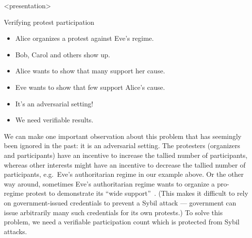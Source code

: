 \begin{frame}<presentation>
  \begin{block}{Verifying protest participation}
    \begin{itemize}
      \item Alice organizes a protest against Eve's regime.
      \item Bob, Carol and others show up.

        \pause

      \item {\color{green} Alice wants to show that many support her cause.}

        \pause

      \item {\color{red} Eve wants to show that few support Alice's cause.}

        \pause

      \item It's an adversarial setting!
      \item We need verifiable results.
    \end{itemize}
  \end{block}
\end{frame}

We can make one important observation about this problem that has seemingly 
been ignored in the past: it is an adversarial setting.
The protesters (organizers and participants) have an incentive to increase the 
tallied number of participants, whereas other interests might have an incentive 
to decrease the tallied number of participants, e.g.\ Eve's authoritarian 
regime in our example above.
Or the other way around, sometimes Eve's authoritarian regime wants to organize 
a pro-regime protest to demonstrate its \enquote{wide 
  support}~\cite[e.g.][]{AlJazeeraOnVenezuela2017,VenezuelanStateWorkersCalledToParticipate}.
(This makes it difficult to rely on government-issued credentials to prevent a 
Sybil attack --- government can issue arbitrarily many such credentials for its 
own protests.)
To solve this problem, we need a verifiable participation count which is 
protected from Sybil attacks.


